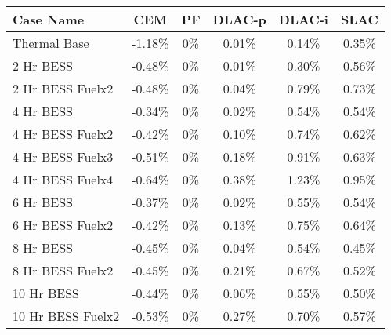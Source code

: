 \begin{tabular}{lccccc}
\toprule
Case Name & CEM & PF & DLAC-p & DLAC-i & SLAC \\
\midrule
Thermal Base & -1.18\% & 0\% & 0.01\% & 0.14\% & 0.35\% \\
2 Hr BESS & -0.48\% & 0\% & 0.01\% & 0.30\% & 0.56\% \\
2 Hr BESS Fuelx2 & -0.48\% & 0\% & 0.04\% & 0.79\% & 0.73\% \\
4 Hr BESS & -0.34\% & 0\% & 0.02\% & 0.54\% & 0.54\% \\
4 Hr BESS Fuelx2 & -0.42\% & 0\% & 0.10\% & 0.74\% & 0.62\% \\
4 Hr BESS Fuelx3 & -0.51\% & 0\% & 0.18\% & 0.91\% & 0.63\% \\
4 Hr BESS Fuelx4 & -0.64\% & 0\% & 0.38\% & 1.23\% & 0.95\% \\
6 Hr BESS & -0.37\% & 0\% & 0.02\% & 0.55\% & 0.54\% \\
6 Hr BESS Fuelx2 & -0.42\% & 0\% & 0.13\% & 0.75\% & 0.64\% \\
8 Hr BESS & -0.45\% & 0\% & 0.04\% & 0.54\% & 0.45\% \\
8 Hr BESS Fuelx2 & -0.45\% & 0\% & 0.21\% & 0.67\% & 0.52\% \\
10 Hr BESS & -0.44\% & 0\% & 0.06\% & 0.55\% & 0.50\% \\
10 Hr BESS Fuelx2 & -0.53\% & 0\% & 0.27\% & 0.70\% & 0.57\% \\
\bottomrule
\end{tabular}
